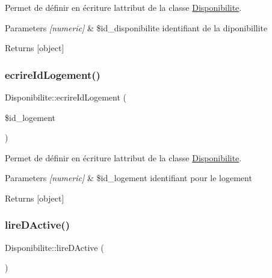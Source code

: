 Permet de définir en écriture l\textquotesingle{}attribut de la classe \hyperlink{class_disponibilite}{Disponibilite}. 


\begin{DoxyParams}{Parameters}
{\em \mbox{[}numeric\mbox{]}} & \$id\+\_\+disponibilite identifiant de la diponibillite \\
\hline
\end{DoxyParams}
\begin{DoxyReturn}{Returns}
\mbox{[}object\mbox{]} 
\end{DoxyReturn}
\mbox{\label{class_disponibilite_a18355ba0d58949eaad8b398505f0831b}} 
\subsubsection{\texorpdfstring{ecrire\+Id\+Logement()}{ecrireIdLogement()}}
{\footnotesize\ttfamily Disponibilite\+::ecrire\+Id\+Logement (\begin{DoxyParamCaption}\item[{}]{\$id\+\_\+logement }\end{DoxyParamCaption})}



Permet de définir en écriture l\textquotesingle{}attribut de la classe \hyperlink{class_disponibilite}{Disponibilite}. 


\begin{DoxyParams}{Parameters}
{\em \mbox{[}numeric\mbox{]}} & \$id\+\_\+logement identifiant pour le logement \\
\hline
\end{DoxyParams}
\begin{DoxyReturn}{Returns}
\mbox{[}object\mbox{]} 
\end{DoxyReturn}
\mbox{\label{class_disponibilite_a30533f5341c48c773bc415b4f1eec391}} 
\subsubsection{\texorpdfstring{lire\+D\+Active()}{lireDActive()}}
{\footnotesize\ttfamily Disponibilite\+::lire\+D\+Active (\begin{DoxyParamCaption}{ }\end{DoxyParamCaption})}



